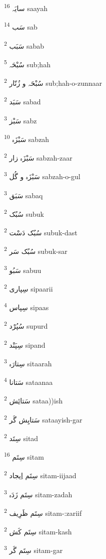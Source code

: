 \documentclass[12pt]{article}
\begin{document}
\begin{RTL}
\begin{multicols}{5}
{\ur سایَہ}   \textsuperscript{16} saayah

{\ur سَب}   \textsuperscript{14} sab

{\ur سَبَب}   \textsuperscript{2} sabab

{\ur سُبْحَہ}   \textsuperscript{5} sub;hah

{\ur سُبْحَہ و زُنّار}   \textsuperscript{2} sub;hah-o-zunnaar

{\ur سَبَد}   \textsuperscript{2} sabad

{\ur سَبْز}   \textsuperscript{3} sabz

{\ur سَبْزَہ}   \textsuperscript{10} sabzah

{\ur سَبْزَہ زار}   \textsuperscript{2} sabzah-zaar

{\ur سَبْزَہ و گُل}   \textsuperscript{3} sabzah-o-gul

{\ur سَبَق}   \textsuperscript{3} sabaq

{\ur سُبُک}   \textsuperscript{2} subuk

{\ur سُبُک دَسْت}   \textsuperscript{2} subuk-dast

{\ur سُبُک سَر}   \textsuperscript{2} subuk-sar

{\ur سَبُو}   \textsuperscript{3} sabuu

{\ur سِپاری}   \textsuperscript{2} sipaarii

{\ur سِپاس}   \textsuperscript{4} sipaas

{\ur سُپُرْد}   \textsuperscript{2} supurd

{\ur سِپَنْد}   \textsuperscript{2} sipand

{\ur سِتارَہ}   \textsuperscript{3} sitaarah

{\ur سَتانا}   \textsuperscript{4} sataanaa

{\ur سَتائِش}   \textsuperscript{2} sataa))ish

{\ur سَتایِش گَر}   \textsuperscript{2} sataayish-gar

{\ur سِتَد}   \textsuperscript{2} sitad

{\ur سِتَم}   \textsuperscript{16} sitam

{\ur سِتَم اِیجاد}   \textsuperscript{2} sitam-iijaad

{\ur سِتَم زَدَہ}   \textsuperscript{3} sitam-zadah

{\ur سِتَم ظَرِیف}   \textsuperscript{2} sitam-:zariif

{\ur سِتَم کَش}   \textsuperscript{2} sitam-kash

{\ur سِتَم گَر}   \textsuperscript{3} sitam-gar


\end{multicols}
\end{RTL}
\end{document}
